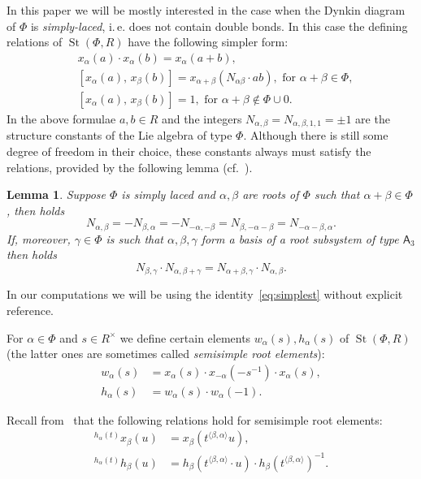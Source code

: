 \documentclass[oneside, 8pt]{amsart}
\newtheorem{lemma}{Lemma}
\theoremstyle{remark}
\theoremstyle{definition}
\numberwithin{lemma}{section}
\numberwithin{prop}{section}
\numberwithin{corollary}{section}
\numberwithin{externaltheorem}{section}
\DeclareMathOperator{\St}{St}
\newcommand{\rA}{\mathsf{A}}
\numberwithin{equation}{section}
\begin{document}
In this paper we will be mostly interested in the case when the Dynkin diagram of $\Phi$ is {\it simply-laced}, i.\,e. does not contain double bonds. In this case the defining relations of $\St(\Phi, R)$ have the following simpler form:
\begin{align}
&x_{\alpha}(a)\cdot x_{\alpha}(b)=x_{\alpha}(a+b), \tag{R1}\\
&[x_{\alpha}(a),\,x_{\beta}(b)]=x_{\alpha+\beta}(N_{\alpha\beta} \cdot ab),\text{ for }\alpha+\beta\in\Phi, \tag{R2} \\
&[x_{\alpha}(a),\,x_{\beta}(b)]=1,\text{ for }\alpha+\beta\not\in\Phi\cup0. \tag{R3}
\end{align}
In the above formulae $a, b \in R$ and the integers $N_{\alpha, \beta} = N_{\alpha, \beta, 1, 1} = \pm 1$ are the structure constants of the Lie algebra of type $\Phi$. Although there is still some degree of freedom in their choice, these constants always must satisfy the relations, provided by the following lemma (cf.~\cite[\S~14]{VP}). 
\begin{lemma} Suppose $\Phi$ is simply laced and $\alpha, \beta$ are roots of $\Phi$ such that $\alpha+\beta\in \Phi$, then holds
\begin{equation} \label{eq:simplest} N_{\alpha, \beta} = -N_{\beta,\alpha} = - N_{-\alpha, -\beta} = N_{\beta, -\alpha-\beta} = N_{-\alpha-\beta, \alpha}. \end{equation}
If, moreover, $\gamma \in \Phi$ is such that $\alpha,\beta,\gamma$ form a basis of a root subsystem of type $\rA_3$ then holds
\begin{equation} \label{eq:cocycle} N_{\beta,\gamma} \cdot N_{\alpha, \beta+\gamma} = N_{\alpha+\beta, \gamma} \cdot N_{\alpha, \beta}. \end{equation} \end{lemma}
In our computations we will be using the identity~\eqref{eq:simplest} without explicit reference.

For $\alpha\in\Phi$ and $s \in R^\times$ we define certain elements $w_\alpha(s), h_\alpha(s)$ of $\St(\Phi, R)$ (the latter ones are sometimes called {\it semisimple root elements}):
\begin{align*} w_\alpha(s) & =  x_\alpha(s) \cdot x_{-\alpha}(-s^{-1}) \cdot x_\alpha(s), \\ h_\alpha(s) & =  w_\alpha(s) \cdot w_\alpha(-1).  \end{align*}

Recall from~\cite[Lemma~5.2]{Ma69} that the following relations hold for semisimple root elements:
\begin{align} \label{eq:conj-h-x} {}^{h_\alpha(t)}\!x_\beta(u) & = x_\beta(t^{\langle \beta,  \alpha \rangle}u), \\ \label{eq:conj-h-h} {}^{h_\alpha(t)}\!h_\beta(u) & = h_\beta(t^{\langle \beta, \alpha \rangle} \cdot u) \cdot h_\beta(t^{\langle \beta,  \alpha \rangle})^{-1}. \end{align}
\end{document}
